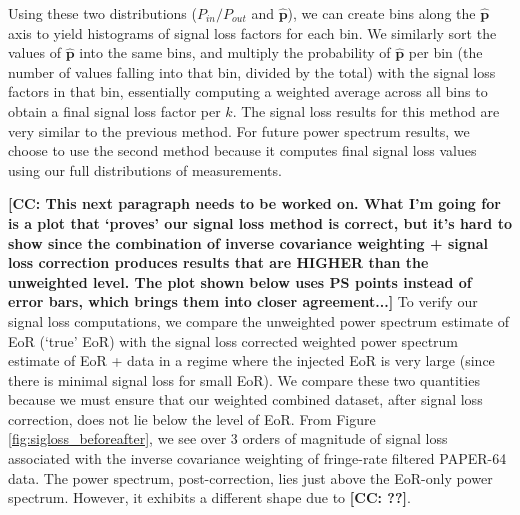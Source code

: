 \documentclass[preprint2,numberedappendix,tighten]{aastex6}  %
\newcommand{\cc}[1]{{\color{purple} \textbf{[CC: #1]}}}
\begin{document}

Using these two distributions ($P_{in}/P_{out}$ and $\hat{\textbf{p}}$), we can create bins along the $\hat{\textbf{p}}$ axis to yield histograms of signal loss factors for each bin. We similarly sort the values of $\hat{\textbf{p}}$ into the same bins, and multiply the probability of $\hat{\textbf{p}}$ per bin (the number of values falling into that bin, divided by the total) with the signal loss factors in that bin, essentially computing a weighted average across all bins to obtain a final signal loss factor per $k$. The signal loss results for this method are very similar to the previous method. For future power spectrum results, we choose to use the second method because it computes final signal loss values using our full distributions of measurements.

\cc{This next paragraph needs to be worked on. What I'm going for is a plot that `proves' our signal loss method is correct, but it's hard to show since the combination of inverse covariance weighting + signal loss correction produces results that are HIGHER than the unweighted level. The plot shown below uses PS points instead of error bars, which brings them into closer agreement...}
To verify our signal loss computations, we compare the unweighted power spectrum estimate of EoR (`true' EoR) with the signal loss corrected weighted power spectrum estimate of EoR + data in a regime where the injected EoR is very large (since there is minimal signal loss for small EoR). We compare these two quantities because we must ensure that our weighted combined dataset, after signal loss correction, does not lie below the level of EoR. From Figure \ref{fig:sigloss_beforeafter}, we see over $3$ orders of magnitude of signal loss associated with the inverse covariance weighting of fringe-rate filtered PAPER-64 data. The power spectrum, post-correction, lies just above the EoR-only power spectrum. However, it exhibits a different shape due to \cc{??}. 
\end{document}
